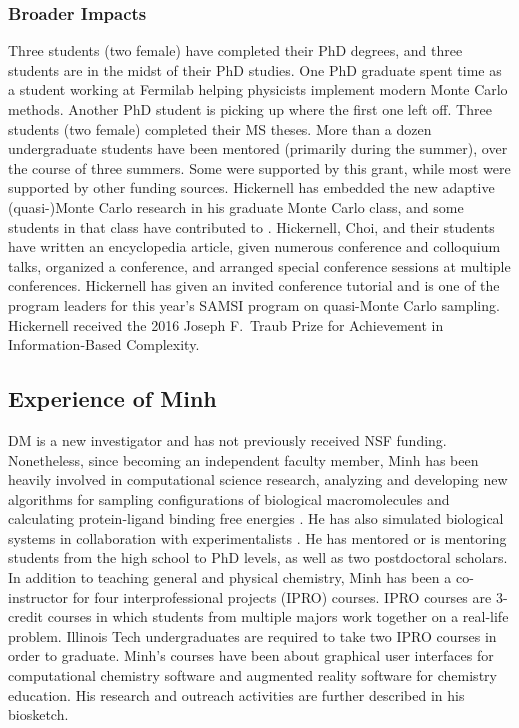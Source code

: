 \documentclass[11pt]{NSFamsart}
\begin{document}
\subsubsection{Broader Impacts}  Three students (two female) have completed their PhD degrees, and three students are in the midst of their PhD studies.  One PhD graduate spent time as a student working at Fermilab helping physicists implement modern Monte Carlo methods.  Another PhD student is picking up where the first one left off.  Three students (two female) completed their MS theses. More than a dozen undergraduate students have been mentored (primarily during the summer),  over the course of three summers.  Some were supported by this grant, while most were supported by other funding sources.  Hickernell has embedded the new adaptive (quasi-)Monte Carlo research in his graduate Monte Carlo class, and some students in that class have contributed to \GAIL.  Hickernell, Choi, and their students have written an encyclopedia article, given numerous conference and colloquium talks, organized a conference, and arranged special conference sessions at multiple conferences.  Hickernell has given an invited conference tutorial and is one of the program leaders for this year's SAMSI program on quasi-Monte Carlo sampling. Hickernell received the 2016 Joseph F.\ Traub Prize for Achievement in Information-Based Complexity.

\subsection{Experience of Minh}

DM is a new investigator and has not previously received NSF funding. Nonetheless, since becoming an independent faculty member, Minh has been heavily involved in computational science research, analyzing \cite{Nguyen2016} and developing new algorithms for sampling configurations of biological macromolecules \cite{Spiridon2017} and calculating protein-ligand binding free energies \cite{Minh2015, Nguyen2017, Xie2017a}. He has also simulated biological systems in collaboration with experimentalists \cite{Tuz2017}. He has mentored or is mentoring students from the high school to PhD levels, as well as two postdoctoral scholars. In addition to teaching general and physical chemistry, Minh has been a co-instructor for four interprofessional projects (IPRO) courses. IPRO courses are 3-credit courses in which students from multiple majors work together on a real-life problem. Illinois Tech undergraduates are required to take two IPRO courses in order to graduate. Minh's courses have been about graphical user interfaces for computational chemistry software and augmented reality software for chemistry education. His research and outreach activities are further described in his biosketch.
\end{document}
